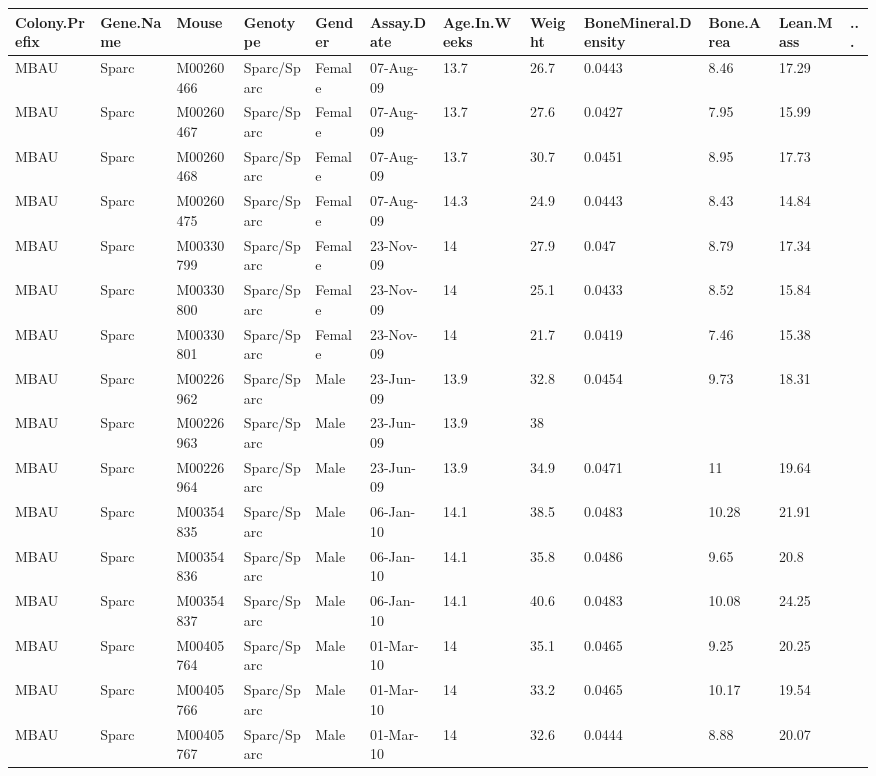 \documentclass[12pt,a4paper]{article}
\begin{document}
\begin{table}
 \begin{tabular}{| p{13mm} | p{13mm} | l | l | l | p{19mm}| p{12mm} | l | p{13mm} | p{12mm} | p{12mm} | l |}
  \hline
Colony.\newline Prefix&Gene.\newline Name&Mouse&\textbf{Genotype}&\textbf{Gender}&\textbf{Assay.\newline Date}&Age.In.\newline Weeks&\textbf{Weight}&Bone\newline Mineral.\newline Density&Bone.\newline Area&Lean.\newline Mass& ... \\\hline
MBAU&Sparc&M00260466&Sparc/Sparc&Female&07-Aug-09&13.7&26.7&0.0443&8.46&17.29&\\
MBAU&Sparc&M00260467&Sparc/Sparc&Female&07-Aug-09&13.7&27.6&0.0427&7.95&15.99&\\
MBAU&Sparc&M00260468&Sparc/Sparc&Female&07-Aug-09&13.7&30.7&0.0451&8.95&17.73&\\
MBAU&Sparc&M00260475&Sparc/Sparc&Female&07-Aug-09&14.3&24.9&0.0443&8.43&14.84&\\
MBAU&Sparc&M00330799&Sparc/Sparc&Female&23-Nov-09&14&27.9&0.047&8.79&17.34&\\
MBAU&Sparc&M00330800&Sparc/Sparc&Female&23-Nov-09&14&25.1&0.0433&8.52&15.84&\\
MBAU&Sparc&M00330801&Sparc/Sparc&Female&23-Nov-09&14&21.7&0.0419&7.46&15.38&\\
MBAU&Sparc&M00226962&Sparc/Sparc&Male&23-Jun-09&13.9&32.8&0.0454&9.73&18.31&\\
MBAU&Sparc&M00226963&Sparc/Sparc&Male&23-Jun-09&13.9&38&&&&\\
MBAU&Sparc&M00226964&Sparc/Sparc&Male&23-Jun-09&13.9&34.9&0.0471&11&19.64&\\
MBAU&Sparc&M00354835&Sparc/Sparc&Male&06-Jan-10&14.1&38.5&0.0483&10.28&21.91&\\
MBAU&Sparc&M00354836&Sparc/Sparc&Male&06-Jan-10&14.1&35.8&0.0486&9.65&20.8&\\
MBAU&Sparc&M00354837&Sparc/Sparc&Male&06-Jan-10&14.1&40.6&0.0483&10.08&24.25&\\
MBAU&Sparc&M00405764&Sparc/Sparc&Male&01-Mar-10&14&35.1&0.0465&9.25&20.25&\\
MBAU&Sparc&M00405766&Sparc/Sparc&Male&01-Mar-10&14&33.2&0.0465&10.17&19.54&\\
MBAU&Sparc&M00405767&Sparc/Sparc&Male&01-Mar-10&14&32.6&0.0444&8.88&20.07&\\

\end{tabular}
\end{table}
\end{document}
